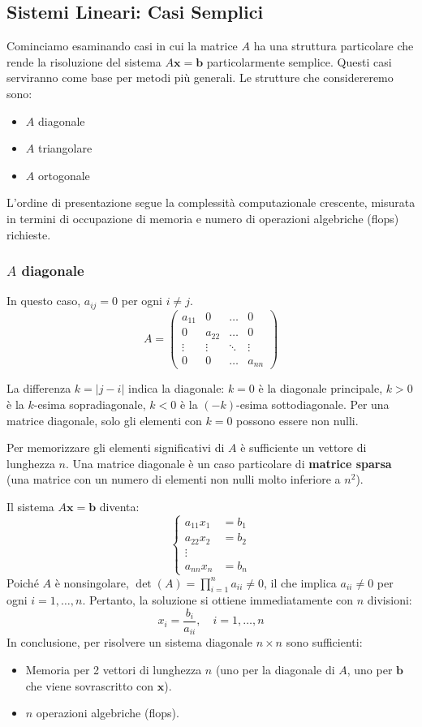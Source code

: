 \subsection{Sistemi Lineari: Casi Semplici}
Cominciamo esaminando casi in cui la matrice $A$ ha una struttura particolare che rende la risoluzione del sistema $A\mathbf{x} = \mathbf{b}$ particolarmente semplice. Questi casi serviranno come base per metodi più generali. Le strutture che considereremo sono:
\begin{itemize}
    \item $A$ diagonale
    \item $A$ triangolare
    \item $A$ ortogonale
\end{itemize}
L'ordine di presentazione segue la complessità computazionale crescente, misurata in termini di occupazione di memoria e numero di operazioni algebriche (flops) richieste.

\subsubsection{$A$ diagonale}
In questo caso, $a_{ij} = 0$ per ogni $i \neq j$.
\[ A = 
\begin{pmatrix}
    a_{11} & 0 & \dots & 0 \\
    0 & a_{22} & \dots & 0 \\
    \vdots & \vdots & \ddots & \vdots \\
    0 & 0 & \dots & a_{nn}
\end{pmatrix}
\]
\begin{osservazione}
La differenza $k = |j-i|$ indica la diagonale: $k=0$ è la diagonale principale, $k>0$ è la $k$-esima sopradiagonale, $k<0$ è la $(-k)$-esima sottodiagonale. Per una matrice diagonale, solo gli elementi con $k=0$ possono essere non nulli.
\end{osservazione}
Per memorizzare gli elementi significativi di $A$ è sufficiente un vettore di lunghezza $n$. Una matrice diagonale è un caso particolare di \textbf{matrice sparsa} (una matrice con un numero di elementi non nulli molto inferiore a $n^2$).

Il sistema $A\mathbf{x} = \mathbf{b}$ diventa:
\[
\begin{cases}
    a_{11}x_1 &= b_1 \\
    a_{22}x_2 &= b_2 \\
    \vdots \\
    a_{nn}x_n &= b_n
\end{cases}
\]
Poiché $A$ è nonsingolare, $\det(A) = \prod_{i=1}^n a_{ii} \neq 0$, il che implica $a_{ii} \neq 0$ per ogni $i=1, \dots, n$.
Pertanto, la soluzione si ottiene immediatamente con $n$ divisioni:
$$ x_i = \frac{b_i}{a_{ii}}, \quad i=1, \dots, n $$
In conclusione, per risolvere un sistema diagonale $n \times n$ sono sufficienti:
\begin{itemize}
    \item Memoria per 2 vettori di lunghezza $n$ (uno per la diagonale di $A$, uno per $\mathbf{b}$ che viene sovrascritto con $\mathbf{x}$).
    \item $n$ operazioni algebriche (flops).
\end{itemize}


